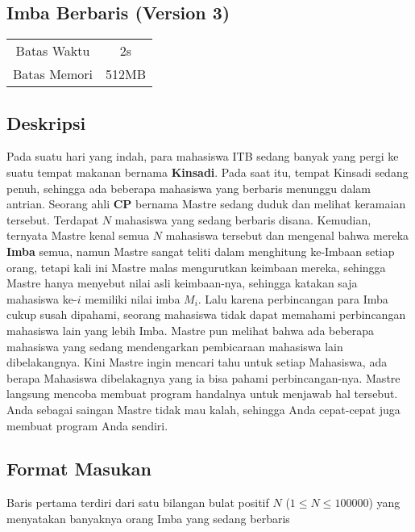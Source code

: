 \documentclass{article}
\begin{document}
\begin{center}
    \section*{Imba Berbaris (Version 3)} %

    \begin{tabular}{ | c c | }
        \hline
        Batas Waktu  & 2s \\    %
        Batas Memori & 512MB \\  %
        \hline
    \end{tabular}
\end{center}

\subsection*{Deskripsi}
Pada suatu hari yang indah, para mahasiswa ITB sedang banyak yang pergi ke suatu tempat makanan bernama \textbf{Kinsadi}. Pada saat itu, tempat Kinsadi sedang penuh, sehingga ada beberapa mahasiswa yang berbaris menunggu dalam antrian. Seorang ahli \textbf{CP} bernama Mastre sedang duduk dan melihat keramaian tersebut. Terdapat $N$ mahasiswa yang sedang berbaris disana. Kemudian, ternyata Mastre kenal semua $N$ mahasiswa tersebut dan mengenal bahwa mereka \textbf{Imba} semua, namun Mastre sangat teliti dalam menghitung ke-Imbaan setiap orang, tetapi kali ini Mastre malas mengurutkan keimbaan mereka, sehingga Mastre hanya menyebut nilai asli keimbaan-nya, sehingga katakan saja mahasiswa ke-$i$ memiliki nilai imba $M_i$. Lalu karena perbincangan para Imba cukup susah dipahami, seorang mahasiswa tidak dapat memahami perbincangan mahasiswa lain yang lebih Imba. Mastre pun melihat bahwa ada beberapa mahasiswa yang sedang mendengarkan pembicaraan mahasiswa lain dibelakangnya. Kini Mastre ingin mencari tahu untuk setiap Mahasiswa, ada berapa Mahasiswa dibelakagnya yang ia bisa pahami perbincangan-nya. Mastre langsung mencoba membuat program handalnya untuk menjawab hal tersebut. Anda sebagai saingan Mastre tidak mau kalah, sehingga Anda cepat-cepat juga membuat program Anda sendiri.

\subsection*{Format Masukan}

Baris pertama terdiri dari satu bilangan bulat positif $N$ ($1 \leq N \leq 100000$) yang menyatakan banyaknya orang Imba yang sedang berbaris
\end{document}
